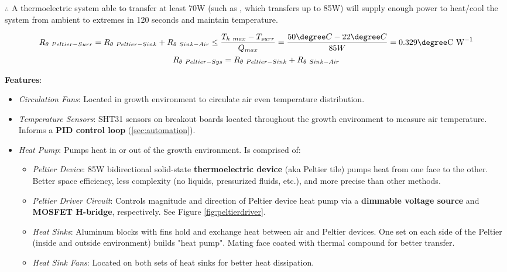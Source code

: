 \documentclass{../tex/report}
\begin{document}
$\therefore$ A thermoelectric system able to transfer at least 70W (such as \cite{peltier}, which transfers up to 85W) will supply enough power to heat/cool the system from ambient to extremes in 120 seconds and maintain temperature.

\begin{gather*}
  \label{eqn:thermalresistance-hot}
  R_{\theta~Peltier-Surr}=R_{\theta~Peltier-Sink}+R_{\theta~Sink-Air}\le\frac{T_{h~max} - T_{surr}}{Q_{max}}=\frac{50\degree C - 22\degree C}{85W}=0.329\degree \text{C W}^{-1}\\
  \label{eqn:thermalresistance-cold}
  R_{\theta~Peltier-Sys}=R_{\theta~Peltier-Sink}+R_{\theta~Sink-Air}
\end{gather*}

\textbf{Features}:
\begin{itemize}
    \item \textit{Circulation Fans}: Located in growth environment to circulate air even temperature distribution.
    \item \textit{Temperature Sensors}: SHT31 \cite{sht31} sensors on breakout boards located throughout the growth environment to measure air temperature. Informs a \textbf{PID control loop} (\ref{sec:automation}).
    \item \textit{Heat Pump}: Pumps heat in or out of the growth environment. Is comprised of:
    \begin{itemize}
        \item \textit{Peltier Device}: 85W bidirectional solid-state \textbf{thermoelectric device} (aka Peltier tile) \cite{peltier} pumps heat from one face to the other. Better space efficiency, less complexity (no liquids, pressurized fluids, etc.), and more precise than other methods.
        \item \textit{Peltier Driver Circuit}: Controls magnitude and direction of Peltier device heat pump via a \textbf{dimmable voltage source} and \textbf{MOSFET H-bridge}, respectively. See Figure \ref{fig:peltierdriver}.
        \item \textit{Heat Sinks}: Aluminum blocks with fins hold and exchange heat between air and Peltier devices. One set on each side of the Peltier (inside and outside environment) builds "heat pump". Mating face coated with thermal compound for better transfer.
        \item \textit{Heat Sink Fans}: Located on both sets of heat sinks for better heat dissipation.
    \end{itemize}
\end{itemize}
\end{document}
